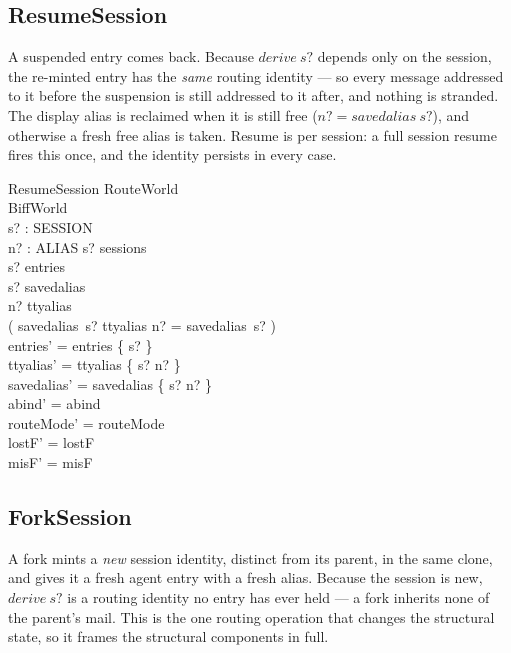 \documentclass[a4paper,10pt,fleqn]{article}
\begin{document}
\subsection{ResumeSession}

A suspended entry comes back.  Because $derive~s?$ depends only on
the session, the re-minted entry has the \emph{same}
routing identity --- so every message addressed to it before the
suspension is still addressed to it after, and nothing is stranded.  The
display alias is reclaimed when it is still free
($n? = savedalias~s?$), and otherwise a fresh free alias is taken.
Resume is per session: a full session resume fires this once, and the
identity persists in every case.

\begin{schema}{ResumeSession}
  \Delta RouteWorld \\
  \Xi BiffWorld \\
  s? : SESSION \\
  n? : ALIAS
  \where
  s? \in sessions \\
  s? \notin entries \\
  s? \in \dom savedalias \\
  n? \notin \ran ttyalias \\
  ( savedalias~s? \notin \ran ttyalias \implies
    n? = savedalias~s? ) \\
  entries' = entries \cup \{ s? \} \\
  ttyalias' = ttyalias \cup \{ s? \mapsto n? \} \\
  savedalias' = savedalias \oplus \{ s? \mapsto n? \} \\
  abind' = abind \\
  routeMode' = routeMode \\
  lostF' = lostF \\
  misF' = misF
\end{schema}

\subsection{ForkSession}

A fork mints a \emph{new} session identity, distinct from its parent, in
the same clone, and gives it a fresh agent entry with a fresh alias.
Because the session is new, $derive~s?$ is a routing identity no
entry has ever held --- a fork inherits none of the parent's mail.  This
is the one routing operation that changes the structural state, so it
frames the structural components in full.
\end{document}
